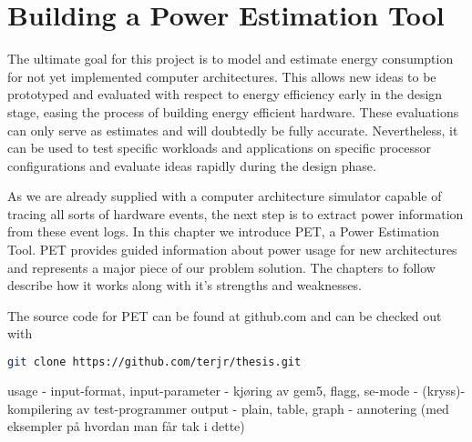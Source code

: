 \chapter{Building a Power Estimation Tool}

The ultimate goal for this project is to model and estimate energy consumption
for not yet implemented computer architectures. This allows new ideas to be prototyped
and evaluated with respect to energy efficiency early in the design stage,
easing the process of building energy efficient hardware. These evaluations can
only serve as estimates and will doubtedly be fully accurate. Nevertheless, it
can be used to test specific workloads and applications on specific processor
configurations and evaluate ideas rapidly during the design phase.

As we are already supplied with a computer architecture simulator capable of
tracing all sorts of hardware events, the next step is to extract power
information from these event logs. In this chapter we introduce PET, a Power
Estimation Tool. PET provides guided information about power usage for new
architectures and represents a major piece of our problem solution. The
chapters to follow describe how it works along with it's strengths and
weaknesses.

\noindent The source code for PET can be found at github.com and can be checked out with
\begin{lstlisting}[language=bash,numbers=none]
git clone https://github.com/terjr/thesis.git
\end{lstlisting}







usage
- input-format, input-parameter
- kjøring av gem5, flagg, se-mode
- (kryss)-kompilering av test-programmer
output
- plain, table, graph
- annotering (med eksempler på hvordan man får tak i dette)
